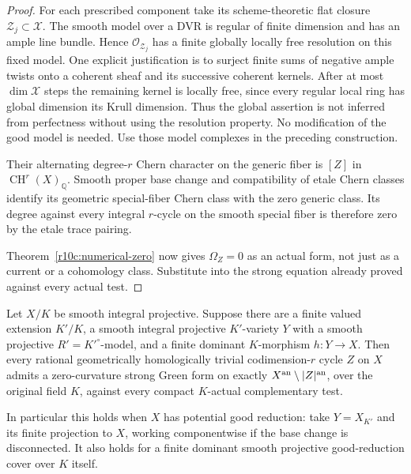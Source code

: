 \begin{proof}
For each prescribed component take its scheme-theoretic flat closure
$\mathcal Z_j\subset\mathcal X$.  The smooth model over a DVR is regular
of finite dimension and has an ample line bundle.  Hence
$\mathcal O_{\mathcal Z_j}$ has a finite globally locally free
resolution on this fixed model.  One explicit justification is to
surject finite sums of negative ample twists onto a coherent sheaf
and its successive coherent kernels.  After at most $\dim\mathcal X$
steps the remaining kernel is locally free, since every regular
local ring has global dimension its Krull dimension.  Thus the
global assertion is not inferred from perfectness without using the
resolution property.  No modification of the good model
is needed.  Use those model complexes in the preceding construction.

Their alternating degree-$r$ Chern character on the generic fiber
is $[Z]$ in $\operatorname{CH}^r(X)_{\mathbb Q}$.  Smooth proper
base change and compatibility of etale Chern classes identify its
geometric special-fiber Chern class with the zero generic class.
Its degree against every integral $r$-cycle on the smooth special
fiber is therefore zero by the etale trace pairing.

Theorem~\ref{r10c:numerical-zero} now gives
$\Omega_Z=0$ as an actual form, not just as a current or a
cohomology class.  Substitute into the strong equation already
proved against every actual test.
\end{proof}

\begin{corollary}
\label{r11p:potential-good-G}
Let $X/K$ be smooth integral projective.  Suppose there are a finite
valued extension $K'/K$, a smooth integral projective $K'$-variety
$Y$ with a smooth projective $R'=K'^\circ$-model, and a finite
dominant $K$-morphism $h:Y\to X$.  Then every rational geometrically
homologically trivial codimension-$r$ cycle $Z$ on $X$ admits a
zero-curvature strong Green form on exactly
$X^{\rm an}\setminus|Z|^{\rm an}$, over the original field $K$,
against every compact $K$-actual complementary test.

In particular this holds when $X$ has potential good reduction:
take $Y=X_{K'}$ and its finite projection to $X$, working componentwise
if the base change is disconnected.
It also holds for a finite dominant smooth projective good-reduction
cover over $K$ itself.
\end{corollary}

